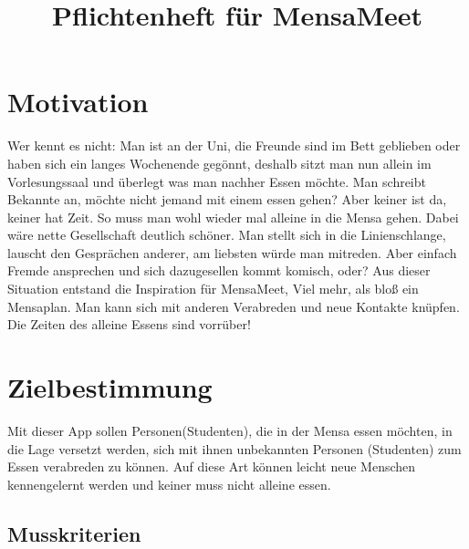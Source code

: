 \documentclass[a4paper]{scrreprt}
\begin{document}
\title{Pflichtenheft für MensaMeet}

\maketitle
 
\tableofcontents

\chapter{Motivation}

Wer kennt es nicht: Man ist an der Uni, die Freunde sind im Bett geblieben oder haben sich ein langes Wochenende gegönnt, deshalb sitzt man nun allein im Vorlesungssaal und überlegt was man nachher Essen möchte. Man schreibt Bekannte an, möchte nicht jemand mit einem essen gehen? Aber keiner ist da, keiner hat Zeit. So muss man wohl wieder mal alleine in die Mensa gehen. Dabei wäre nette Gesellschaft deutlich schöner. Man stellt sich in die Linienschlange, lauscht den Gesprächen anderer, am liebsten würde man mitreden. Aber einfach Fremde ansprechen und sich dazugesellen kommt komisch, oder? Aus dieser Situation entstand die Inspiration für MensaMeet, Viel mehr, als bloß ein Mensaplan. Man kann sich mit anderen Verabreden und neue Kontakte knüpfen. Die Zeiten des alleine Essens sind vorrüber!

\chapter{Zielbestimmung}
Mit dieser App sollen Personen(Studenten), die in der Mensa essen möchten, in die Lage versetzt werden, sich mit ihnen unbekannten Personen (Studenten) zum Essen verabreden zu können. Auf diese Art können leicht neue Menschen kennengelernt werden und keiner muss nicht alleine essen.
 
\section{Musskriterien}
\end{document}
